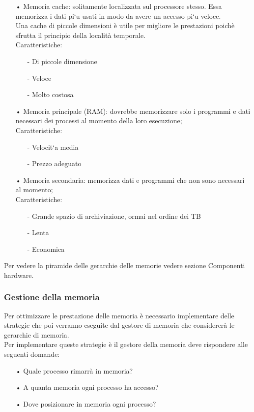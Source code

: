 \documentclass{article}
\begin{document}
\begin{enumerate}
   \item[•] Memoria cache: solitamente localizzata sul processore stesso. Essa memorizza i dati pi`u usati in modo da avere un accesso pi`u veloce.
            \\Una cache di piccole dimensioni è utile per migliore le prestazioni poichè sfrutta il principio della località temporale.\\
            Caratteristiche:
               \begin{enumerate}
                  \item[-] Di piccole dimensione
                  \item[-] Veloce
                  \item[-] Molto costosa
               \end{enumerate}
   \item[•] Memoria principale (RAM): dovrebbe memorizzare solo i programmi e dati necessari dei processi al momento della loro esecuzione;
            \\Caratteristiche:
               \begin{enumerate}
                  \item[-] Velocit`a media
                  \item[-] Prezzo adeguato
               \end{enumerate}
   \item[•] Memoria secondaria: memorizza dati e programmi che non sono necessari al momento;
            \\Caratteristiche:
               \begin{enumerate}
                  \item[-] Grande spazio di archiviazione, ormai nel ordine dei TB
                  \item[-] Lenta
                  \item[-] Economica
               \end{enumerate}
\end{enumerate}
Per vedere la piramide delle gerarchie delle memorie vedere sezione Componenti
hardware.

\subsubsection{Gestione della memoria}
Per ottimizzare le prestazione delle memoria è necessario implementare delle
strategie che poi verranno eseguite dal gestore di memoria che considererà le
gerarchie di memoria.
\\Per implementare queste strategie è il gestore della memoria deve rispondere
alle seguenti domande:
\begin{enumerate}
   \item[•] Quale processo rimarrà in memoria?
   \item[•] A quanta memoria ogni processo ha accesso?
   \item[•] Dove posizionare in memoria ogni processo?
\end{enumerate}
\end{document}
